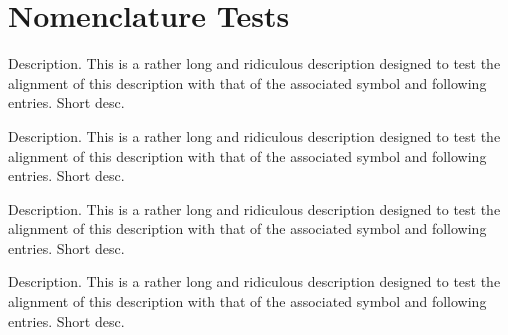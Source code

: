 
\chapter{Nomenclature Tests}

\MakeNomenclatureNotStarred
{}
\begin{Nomenclature}[section]
      {Description. This is a rather long and ridiculous description designed to test the alignment of 
                 this description with that of the associated symbol and following entries.}
        {Short desc.}   
    
          { Description. This is a rather long and ridiculous description designed to test the alignment of 
                        this description with that of the associated symbol and following entries.}
            {Short desc.}   
        
        
              { Description. This is a rather long and ridiculous description designed to test the alignment of 
                            this description with that of the associated symbol and following entries.}
                {Short desc.}


          { Description. This is a rather long and ridiculous description designed to test the alignment of 
                        this description with that of the associated symbol and following entries.}
            {Short desc.}

\end{Nomenclature}

